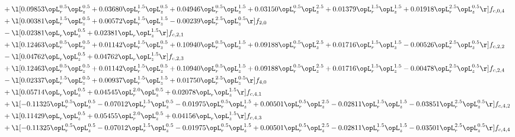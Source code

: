 \begin{alignat}{2}
& + \l[  0.09853 \opL_r^{0.5} \opL_z^{0.5} +  0.03680 \opL_r^{1.5} \opL_z^{0.5} +  0.04946 \opL_r^{0.5} \opL_z^{1.5} +  0.03150 \opL_r^{0.5} \opL_z^{2.5} +  0.01379 \opL_r^{1.5} \opL_z^{1.5} +  0.01918 \opL_r^{2.5} \opL_z^{0.5}  \r] f_{c,0,4} \nonumber \\ 
& + \l[  0.00381 \opL_r^{1.5} \opL_z^{0.5} +  0.00572 \opL_r^{1.5} \opL_z^{1.5}   -0.00239 \opL_r^{2.5} \opL_z^{0.5}  \r] f_{2,0} \nonumber \\ 
& - \l[  0.02381 \opL_r \opL_z^{0.5} +  0.02381 \opL_r \opL_z^{1.5}  \r] f_{c,2,1} \nonumber \\ 
& + \l[  0.12463 \opL_r^{0.5} \opL_z^{0.5} +  0.01142 \opL_r^{1.5} \opL_z^{0.5} +  0.10940 \opL_r^{0.5} \opL_z^{1.5} +  0.09188 \opL_r^{0.5} \opL_z^{2.5} +  0.01716 \opL_r^{1.5} \opL_z^{1.5}   -0.00526 \opL_r^{2.5} \opL_z^{0.5}  \r] f_{c,2,2} \nonumber \\ 
& - \l[  0.04762 \opL_r \opL_z^{0.5} +  0.04762 \opL_r \opL_z^{1.5}  \r] f_{c,2,3} \nonumber \\ 
& + \l[  0.12463 \opL_r^{0.5} \opL_z^{0.5} +  0.01142 \opL_r^{1.5} \opL_z^{0.5} +  0.10940 \opL_r^{0.5} \opL_z^{1.5} +  0.09188 \opL_r^{0.5} \opL_z^{2.5} +  0.01716 \opL_r^{1.5} \opL_z^{1.5}   -0.00478 \opL_r^{2.5} \opL_z^{0.5}  \r] f_{c,2,4} \nonumber \\ 
& - \l[  0.02337 \opL_r^{1.5} \opL_z^{0.5} +  0.00937 \opL_r^{1.5} \opL_z^{1.5} +  0.01750 \opL_r^{2.5} \opL_z^{0.5}  \r] f_{4,0} \nonumber \\ 
& + \l[  0.05714 \opL_r \opL_z^{0.5} +  0.04545 \opL_r^{2.0} \opL_z^{0.5} +  0.02078 \opL_r \opL_z^{1.5}  \r] f_{c,4,1} \nonumber \\ 
& + \l[  -0.11325 \opL_r^{0.5} \opL_z^{0.5}   -0.07012 \opL_r^{1.5} \opL_z^{0.5}   -0.01975 \opL_r^{0.5} \opL_z^{1.5} +  0.00501 \opL_r^{0.5} \opL_z^{2.5}   -0.02811 \opL_r^{1.5} \opL_z^{1.5}   -0.03851 \opL_r^{2.5} \opL_z^{0.5}  \r] f_{c,4,2} \nonumber \\ 
& + \l[  0.11429 \opL_r \opL_z^{0.5} +  0.05455 \opL_r^{2.0} \opL_z^{0.5} +  0.04156 \opL_r \opL_z^{1.5}  \r] f_{c,4,3} \nonumber \\ 
& + \l[  -0.11325 \opL_r^{0.5} \opL_z^{0.5}   -0.07012 \opL_r^{1.5} \opL_z^{0.5}   -0.01975 \opL_r^{0.5} \opL_z^{1.5} +  0.00501 \opL_r^{0.5} \opL_z^{2.5}   -0.02811 \opL_r^{1.5} \opL_z^{1.5}   -0.03501 \opL_r^{2.5} \opL_z^{0.5}  \r] f_{c,4,4} \nonumber \\ 
\end{alignat} 


